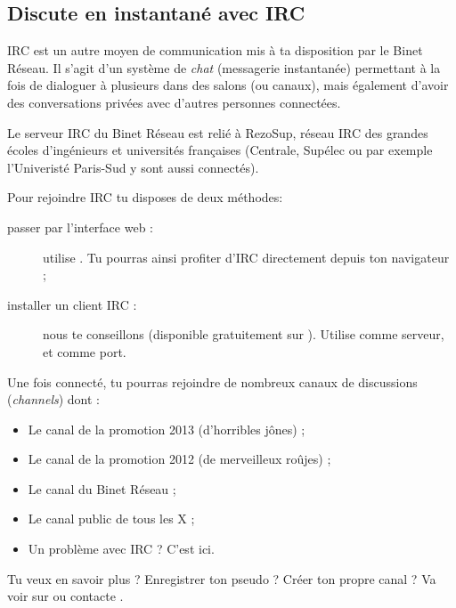 %
\subsection{Discute en instantan\'e avec IRC}

\label{irc}

IRC est un autre moyen de communication mis \`a ta disposition par le Binet R\'eseau.
Il s'agit d'un syst\`eme de \emph{chat} (messagerie instantan\'ee) permettant \`a la fois de dialoguer \`a plusieurs dans des salons (ou canaux),
mais \'egalement d'avoir des conversations priv\'ees avec d'autres personnes connect\'ees.


Le serveur IRC du Binet R\'eseau est reli\'e \`a RezoSup, r\'eseau IRC des grandes \'ecoles d'ing\'enieurs et universit\'es françaises (Centrale, Sup\'elec ou par exemple l'Univerist\'e Paris-Sud y sont aussi connect\'es).

Pour rejoindre IRC tu disposes de deux m\'ethodes:

                  
\begin{description}
  \item[passer par l'interface web :] utilise . Tu pourras ainsi profiter d'IRC directement depuis ton navigateur ;
  \item[installer un client IRC :] nous te conseillons  (disponible gratuitement sur \linebreak {}). Utilise   comme serveur, et  comme port.
\end{description}

 
Une fois connect\'e, tu pourras rejoindre de nombreux canaux de discussions (\emph{channels}) dont :
\begin{itemize}
  \item {} Le canal de la promotion 2013 (d'horribles j\^ones) ;
   \item {} Le canal de la promotion 2012 (de merveilleux ro\^ujes) ;
  \item {} Le canal du Binet R\'eseau ;
  \item {} Le canal public de tous les X ;
  \item {} Un probl\`eme avec IRC ? C'est ici.
\end{itemize}

 Tu veux en savoir plus ? Enregistrer ton pseudo ? Cr\'eer ton propre canal ? Va voir sur  ou contacte .


